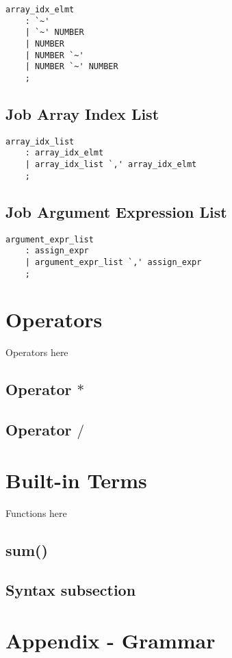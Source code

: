 \documentclass[prodmode,acmtecs]{acmsmall}
\begin{document}
\begin{lstlisting}
array_idx_elmt
	: `~'
	| `~' NUMBER
	| NUMBER
	| NUMBER `~'
	| NUMBER `~' NUMBER
	;
\end{lstlisting}

\subsection{Job Array Index List}

\begin{lstlisting}
array_idx_list
	: array_idx_elmt
	| array_idx_list `,' array_idx_elmt
	;
\end{lstlisting}
\subsection{Job Argument Expression List}

\begin{lstlisting}
argument_expr_list
	: assign_expr
	| argument_expr_list `,' assign_expr
	;
\end{lstlisting}

\section{Operators}
Operators here

\subsection{Operator $*$}

\subsection{Operator $/$}

\section{Built-in Terms}
Functions here

\subsection{sum()}

\subsection{Syntax subsection}

\section*{Appendix - Grammar}
\end{document}
